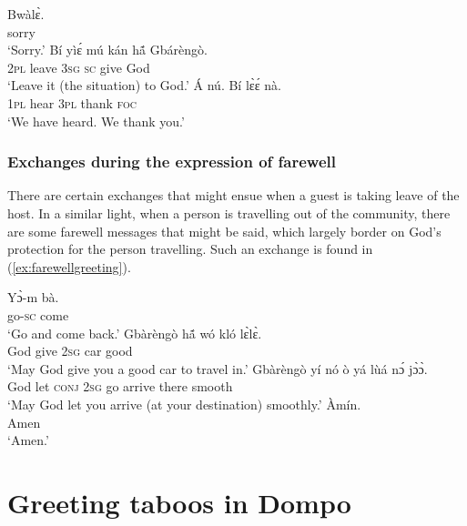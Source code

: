 \documentclass[output=paper,colorlinks,citecolor=brown]{langscibook}
\begin{document}
\ea \label{ex:sympathygreeting}
\begin{xlist}
\ex
   \gll Bwàlɛ̀.\\
sorry\\
   \glt `Sorry.'    
   \ex
   \gll Bí	yìɛ́	mú	kán	hã́	Gbárèngò.\\
\textsc{2pl}	leave	\textsc{3sg}	\textsc{sc}	give	God\\
   \glt `Leave it (the situation) to God.' 
   \ex 
   \gll Á	nú.	Bí	lɛ̀ɛ́	nà. \\
   \textsc{1pl}	hear	\textsc{3pl}	thank	\textsc{foc}\\
\glt `We have heard. We thank you.'   
\end{xlist} 
\z


\subsubsection{Exchanges during the expression of farewell}

There are certain exchanges that might ensue when a guest is taking leave of the host. In a similar light, when a person is travelling out of the community, there are some farewell messages that might be said, which largely border on God’s protection for the person travelling. Such an exchange is found in (\ref{ex:farewellgreeting}). 

\ea \label{ex:farewellgreeting}
\begin{xlist}
\ex
   \gll Yɔ̀-m	bà.\\
go-\textsc{sc}	come\\
   \glt `Go and come back.'    
   \ex
   \gll Gbàrèngò	hã́	wó	kló	lɛ̀lɛ̀.\\
God		give	\textsc{2sg}	car	good \\
   \glt `May God give you a good car to travel in.' 
   \ex 
   \gll Gbàrèngò	yí	nó	ò	yá	lùá	nɔ́	jɔ̀ɔ̀. \\
  God		let	\textsc{conj}	\textsc{2sg}	go	arrive	there	smooth	\\
\glt `May God let you arrive (at your destination) smoothly.'  
\ex 
\gll Àmín.\\
Amen\\
\glt `Amen.'   
\end{xlist} 
\z


\section{Greeting taboos in Dompo}
\end{document}
